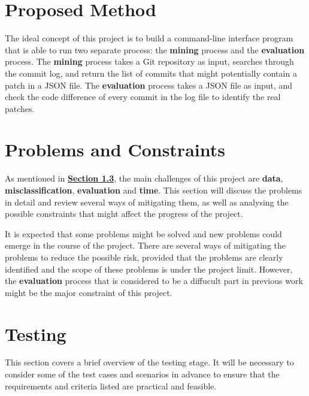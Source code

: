 \documentclass[12pt, a4paper]{report}
\begin{document}
{\section{Proposed Method}
The ideal concept of this project is to build a command-line interface program that is able to run
two separate process: the \textbf{mining} process and the \textbf{evaluation} process. The
\textbf{mining} process takes a Git repository as input, searches through the commit log, and return
the list of commits that might potentially contain a patch in a JSON file. The \textbf{evaluation}
process takes a JSON file as input, and check the code difference of every commit in the log file to
identify the real patches.

\section{Problems and Constraints}
As mentioned in \hyperref[sec:challenges]{\textbf{Section 1.3}}, the main challenges of this project
are \textbf{data}, \textbf{misclassification}, \textbf{evaluation} and \textbf{time}. This section
will discuss the problems in detail and review several ways of mitigating them, as well as analysing
the possible constraints that might affect the progress of the project.

It is expected that some problems might be solved and new problems could emerge in the course of the
project. There are several ways of mitigating the problems to reduce the possible risk, provided
that the problems are clearly identified and the scope of these problems is under the project limit.
However, the \textbf{evaluation} process that is considered to be a diffucult part in previous work
might be the major constraint of this project.


\section{Testing}
This section covers a brief overview of the testing stage. It will be necessary to consider some of
the test cases and scenarios in advance to ensure that the requirements and criteria listed are
practical and feasible.

}
\end{document}
